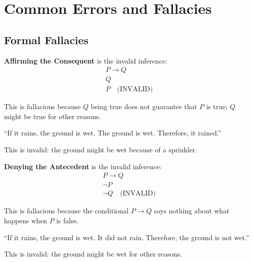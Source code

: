 
\section{Common Errors and Fallacies}

\subsection{Formal Fallacies}

\begin{definition}
\textbf{Affirming the Consequent} is the invalid inference:
\[
\begin{array}{l}
P \rightarrow Q \\
Q \\ \hline
P \quad \text{(INVALID)}
\end{array}
\]

This is fallacious because $Q$ being true does not guarantee that $P$ is true;
$Q$ might be true for other reasons.
\end{definition}

\begin{example}
``If it rains, the ground is wet. The ground is wet. Therefore, it rained.''

This is invalid: the ground might be wet because of a sprinkler.
\end{example}

\begin{definition}
\textbf{Denying the Antecedent} is the invalid inference:
\[
\begin{array}{l}
P \rightarrow Q \\
\neg P \\ \hline
\neg Q \quad \text{(INVALID)}
\end{array}
\]

This is fallacious because the conditional $P \rightarrow Q$ says nothing about
what happens when $P$ is false.
\end{definition}

\begin{example}
``If it rains, the ground is wet. It did not rain. Therefore, the ground is not wet.''

This is invalid: the ground might be wet for other reasons.
\end{example}

